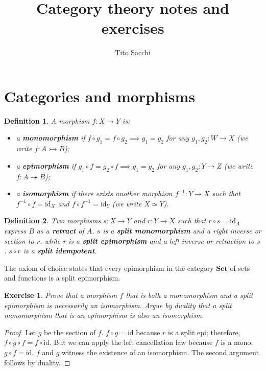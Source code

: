 \documentclass[a5paper,oneside,11pt]{article}
\title{Category theory notes and exercises}
\author{Tito Sacchi}
\newtheorem{ex}{Exercise}
\newtheorem{defn}{Definition}
\newcommand\id{\mathord{\mathrm{id}}}
\newcommand\1{\mathord{\mathrm{1}}}
\newcommand\cat[1]{\mathbf{#1}}
\begin{document}
\maketitle

\section{Categories and morphisms}
\begin{defn}
\label{defn:monoepi}
A morphism $f : X \rightarrow Y$ is:
\begin{itemize}
    \item a \textbf{monomorphism} if $ f \circ g_1 = f \circ g_2 \implies g_1 = g_2$
        for any $g_1, g_2 : W \rightarrow X$ (we write $f : A \rightarrowtail B$);
    \item a \textbf{epimorphism}  if $ g_1 \circ f = g_2 \circ f \implies g_1 = g_2$
        for any $g_1, g_2 : Y \rightarrow Z$ (we write $f : A \twoheadrightarrow B$);
    \item a \textbf{isomorphism} if there exists another morphism $f^{-1} : Y \rightarrow X$
        such that $f^{-1} \circ f = \id_X$ and $f \circ f^{-1} = \id_Y$ (we write $X \simeq Y$).
\end{itemize}
\end{defn}
\begin{defn}
\label{defn:split}
Two morphisms $s : X \rightarrow Y$ and $r : Y \rightarrow X$ such that
$r \circ s = \id_A$ express $B$ as a \textbf{retract} of $A$. $s$ is
a \textbf{split monomorphism} and a right inverse or section to $r$,
while r is a \textbf{split epimorphism} and a left inverse or retraction to $s$.
$s \circ r$ is a \textbf{split idempotent}.
\end{defn}

The axiom of choice states that every epimorphism in the category $\cat{Set}$ of
sets and functions is a split epimorphism.

\begin{ex}
    Prove that a morphism $f$ that is both a monomorphism and a split
    epimorphism is necessarily an isomorphism.
    Argue by duality that a split monomorphism that is an epimorphism is also
    an isomorphism.
\end{ex}
\begin{proof}
    Let $g$ be the section of $f$.
    $f \circ g = \id$ because $r$ is a split epi; therefore,
    $f \circ g \circ f = f \circ \id$.
    But we can apply the left cancellation law because $f$ is a mono: $g \circ f = \id$.
    $f$ and $g$ witness the existence of an isomorphism.
    The second argument follows by duality.
\end{proof}
\end{document}
